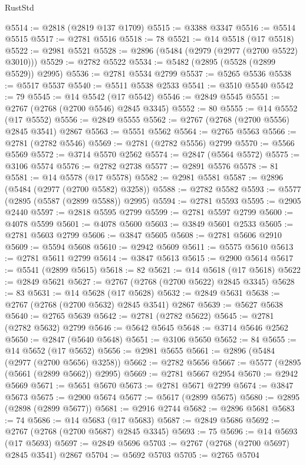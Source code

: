 \begin{lexlean}{RustStd}
\begin{coremodule}
@5514 := @2818 (@2819 @137 @1709)
@5515 := @3388 @3347
@5516 := @5514 @5515
@5517 := @2781 @5516
@5518 := 78
@5521 := @14 @5518 (@17 @5518)
@5522 := @2981 @5521
@5528 := @2896 (@5484 (@2979 (@2977 (@2700 @5522) @3010)))
@5529 := @2782 @5522
@5534 := @5482 (@2895 (@5528 (@2899 @5529)) @2995)
@5536 := @2781 @5534 @2799
@5537 := @5265 @5536
@5538 := @5517 @5537
@5540 := @5511 @5538 @2533
@5541 := @3510 @5540
@5542 := 79
@5545 := @14 @5542 (@17 @5542)
@5546 := @2849 @5545
@5551 := @2767 (@2768 (@2700 @5546) @2845 @3345)
@5552 := 80
@5555 := @14 @5552 (@17 @5552)
@5556 := @2849 @5555
@5562 := @2767 (@2768 (@2700 @5556) @2845 @3541) @2867
@5563 := @5551 @5562
@5564 := @2765 @5563
@5566 := @2781 (@2782 @5546)
@5569 := @2781 (@2782 @5556) @2799
@5570 := @5566 @5569
@5572 := @3714 @5570 @2562
@5574 := @2847 (@5564 @5572)
@5575 := @3106 @5574
@5576 := @2782 @2738
@5577 := @2891 @5576
@5578 := 81
@5581 := @14 @5578 (@17 @5578)
@5582 := @2981 @5581
@5587 := @2896 (@5484 (@2977 (@2700 @5582) @3258))
@5588 := @2782 @5582
@5593 := @5577 (@2895 (@5587 (@2899 @5588)) @2995)
@5594 := @2781 @5593
@5595 := @2905 @2440
@5597 := @2818 @5595 @2799
@5599 := @2781 @5597 @2799
@5600 := @4078 @5599
@5601 := @4078 @5600
@5603 := @3849 @5601 @2533
@5605 := @2781 @5603 @2799
@5606 := @3847 @5605
@5608 := @2781 @5606 @2910
@5609 := @5594 @5608
@5610 := @2942 @5609
@5611 := @5575 @5610
@5613 := @2781 @5611 @2799
@5614 := @3847 @5613
@5615 := @2900 @5614
@5617 := @5541 (@2899 @5615)
@5618 := 82
@5621 := @14 @5618 (@17 @5618)
@5622 := @2849 @5621
@5627 := @2767 (@2768 (@2700 @5622) @2845 @3345)
@5628 := 83
@5631 := @14 @5628 (@17 @5628)
@5632 := @2849 @5631
@5638 := @2767 (@2768 (@2700 @5632) @2845 @3541) @2867
@5639 := @5627 @5638
@5640 := @2765 @5639
@5642 := @2781 (@2782 @5622)
@5645 := @2781 (@2782 @5632) @2799
@5646 := @5642 @5645
@5648 := @3714 @5646 @2562
@5650 := @2847 (@5640 @5648)
@5651 := @3106 @5650
@5652 := 84
@5655 := @14 @5652 (@17 @5652)
@5656 := @2981 @5655
@5661 := @2896 (@5484 (@2977 (@2700 @5656) @3258))
@5662 := @2782 @5656
@5667 := @5577 (@2895 (@5661 (@2899 @5662)) @2995)
@5669 := @2781 @5667 @2954
@5670 := @2942 @5669
@5671 := @5651 @5670
@5673 := @2781 @5671 @2799
@5674 := @3847 @5673
@5675 := @2900 @5674
@5677 := @5617 (@2899 @5675)
@5680 := @2895 (@2898 (@2899 @5677))
@5681 := @2916 @2744
@5682 := @2896 @5681
@5683 := 74
@5686 := @14 @5683 (@17 @5683)
@5687 := @2849 @5686
@5692 := @2767 (@2768 (@2700 @5687) @2845 @3345)
@5693 := 75
@5696 := @14 @5693 (@17 @5693)
@5697 := @2849 @5696
@5703 := @2767 (@2768 (@2700 @5697) @2845 @3541) @2867
@5704 := @5692 @5703
@5705 := @2765 @5704

\end{coremodule}
\end{lexlean}
